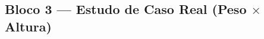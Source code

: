 \documentclass[12pt,a4paper]{article}
\providecommand{\DIFaddbegin}{} %
\providecommand{\DIFaddend}{} %
\providecommand{\DIFaddincludegraphics}[2][]{{\color{blue}\fbox{\DIFOincludegraphics[#1]{#2}}}} %
\DeclareRobustCommand{\DIFaddbegin}{\DIFOaddbegin \let\includegraphics\DIFaddincludegraphics} %
\DeclareRobustCommand{\DIFaddend}{\DIFOaddend \let\includegraphics\DIFOincludegraphics} %
\begin{document}
\subsection{Bloco 3 — Estudo de Caso Real (Peso $\times$ Altura)}
\DIFaddbegin \label{sec:res_bloco3}
\DIFaddend 
\end{document}
